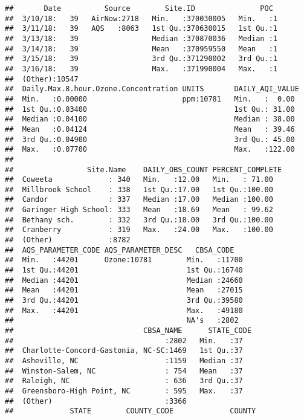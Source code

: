 \documentclass[]{article}
\begin{document}
\begin{verbatim}
##       Date          Source        Site.ID               POC   
##  3/10/18:   39   AirNow:2718   Min.   :370030005   Min.   :1  
##  3/11/18:   39   AQS   :8063   1st Qu.:370630015   1st Qu.:1  
##  3/13/18:   39                 Median :370870036   Median :1  
##  3/14/18:   39                 Mean   :370959550   Mean   :1  
##  3/15/18:   39                 3rd Qu.:371290002   3rd Qu.:1  
##  3/16/18:   39                 Max.   :371990004   Max.   :1  
##  (Other):10547                                                
##  Daily.Max.8.hour.Ozone.Concentration UNITS       DAILY_AQI_VALUE 
##  Min.   :0.00000                      ppm:10781   Min.   :  0.00  
##  1st Qu.:0.03400                                  1st Qu.: 31.00  
##  Median :0.04100                                  Median : 38.00  
##  Mean   :0.04124                                  Mean   : 39.46  
##  3rd Qu.:0.04900                                  3rd Qu.: 45.00  
##  Max.   :0.07700                                  Max.   :122.00  
##                                                                   
##                 Site.Name    DAILY_OBS_COUNT PERCENT_COMPLETE
##  Coweeta             : 340   Min.   :12.00   Min.   : 71.00  
##  Millbrook School    : 338   1st Qu.:17.00   1st Qu.:100.00  
##  Candor              : 337   Median :17.00   Median :100.00  
##  Garinger High School: 333   Mean   :18.69   Mean   : 99.62  
##  Bethany sch.        : 332   3rd Qu.:18.00   3rd Qu.:100.00  
##  Cranberry           : 319   Max.   :24.00   Max.   :100.00  
##  (Other)             :8782                                   
##  AQS_PARAMETER_CODE AQS_PARAMETER_DESC   CBSA_CODE    
##  Min.   :44201      Ozone:10781        Min.   :11700  
##  1st Qu.:44201                         1st Qu.:16740  
##  Median :44201                         Median :24660  
##  Mean   :44201                         Mean   :27015  
##  3rd Qu.:44201                         3rd Qu.:39580  
##  Max.   :44201                         Max.   :49180  
##                                        NA's   :2802   
##                              CBSA_NAME      STATE_CODE
##                                   :2802   Min.   :37  
##  Charlotte-Concord-Gastonia, NC-SC:1469   1st Qu.:37  
##  Asheville, NC                    :1159   Median :37  
##  Winston-Salem, NC                : 754   Mean   :37  
##  Raleigh, NC                      : 636   3rd Qu.:37  
##  Greensboro-High Point, NC        : 595   Max.   :37  
##  (Other)                          :3366               
##             STATE        COUNTY_CODE             COUNTY    

\end{verbatim}
\end{document}

